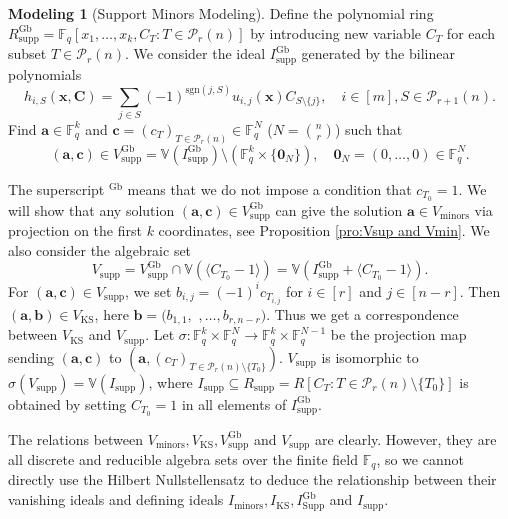 \documentclass[a4paper, 11pt]{amsart}
\newcommand{\mc}[1]{\mathcal{#1}}
\newcommand{\mb}[1]{\mathbb{#1}}
\newcommand{\ideala}[1]{\langle{#1}\rangle}
\newcommand{\ssm}[1]{\sum_{#1}}
\newcommand{\td}[1]{\bm{#1}}
\newcommand{\tx}[1]{\text{#1}}
\newcommand{\fq}{\mathbb{F}_q}
\theoremstyle{definition}
\theoremstyle{definition}
\newtheorem{model}{Modeling}
\begin{document}
	\begin{model}[Support Minors Modeling]\label{mod:SM}
		Define the polynomial ring $R_{\tx{supp}}^{\tx{Gb}}=\fq[x_1,\dots,x_k,C_T:T\in\mc{P}_r(n)]$ by introducing new variable $C_T$ for each subset $T\in\mc{P}_r(n)$. We consider the ideal $I_{\tx{supp}}^{\tx{Gb}}$ generated by the bilinear polynomials 
		\begin{equation}\label{eq:SM poly}
			h_{i,S}(\td{x},\td{C})=\ssm{j\in S}(-1)^{\tx{sgn}(j,S)}u_{i,j}(\td{x})C_{S\setminus\{j\}},\quad i\in[m],S\in\mc{P}_{r+1}(n).
		\end{equation}
		Find $\td{a}\in\fq^k$ and $\td{c}=(c_T)_{T\in\mc{P}_r(n)}\in\fq^N$ ($N=\binom{n}{r}$) such that
		\begin{equation*}
			(\td{a},\td{c})\in V^{\tx{Gb}}_{\tx{supp}}=\mb{V}(I^{\tx{Gb}}_{\tx{supp}})\setminus(\fq^k\times\{\td{0}_N\}),\quad\td{0}_N=(0,\dots,0)\in\fq^N.
		\end{equation*}
	\end{model}
	
	The superscript $^{\tx{Gb}}$ means that we do not impose a condition that $c_{T_0}=1$. We will show that any solution $(\td{a},\td{c})\in V^{\tx{Gb}}_{\tx{supp}}$ can give the solution $\td{a}\in V_{\tx{minors}}$ via projection on the first $k$ coordinates, see Proposition \ref{pro:Vsup and Vmin}. We also consider the algebraic set 
	\begin{equation*}
		V_{\tx{supp}}=V^{\tx{Gb}}_{\tx{supp}}\cap \mb{V}(\ideala{C_{T_0}-1})=\mb{V}(I^{\tx{Gb}}_{\tx{supp}}+\ideala{C_{T_0}-1}).
	\end{equation*}
	For $(\td{a},\td{c})\in V_{\tx{supp}}$, we set $b_{i,j}=(-1)^ic_{T_{i,j}}$ for $i\in[r]$ and $j\in[n-r]$. Then $(\td{a},\td{b})\in V_{\tx{KS}}$, here $\td{b}=(b_{1,1},$ $,\dots,b_{r,n-r})$. Thus we get a correspondence between $V_{\tx{KS}}$ and $V_{\tx{supp}}$. Let $\sigma:\fq^k\times \fq^{N}\to\fq^k\times\fq^{N-1}$ be the projection map sending $(\td{a},\td{c})$ to $(\td{a},(c_T)_{T\in\mc{P}_r(n)\setminus \{T_0\}})$. $V_{\tx{supp}}$ is isomorphic to $\sigma(V_{\tx{supp}})=\mb{V}(I_{\tx{supp}})$, where $I_{\tx{supp}}\subseteq R_{\tx{supp}}=R[C_T:T\in\mc{P}_r(n)\setminus\{T_0\}]$ is obtained by setting $C_{T_0}=1$ in all elements of $I_{\tx{supp}}^{\tx{Gb}}$. 
	
	The relations between $V_{\tx{minors}},V_{\tx{KS}},V^{\tx{Gb}}_{\tx{supp}}$ and $V_{\tx{supp}}$ are clearly. However, they are all discrete and reducible algebra sets over the finite field $\fq$, so we cannot directly use the Hilbert Nullstellensatz to deduce the relationship between their vanishing ideals and defining ideals $I_{\tx{minors}},I_{\tx{KS}},I_{\tx{Supp}}^{\tx{Gb}}$ and $I_{\tx{supp}}$.
	
\end{document}
